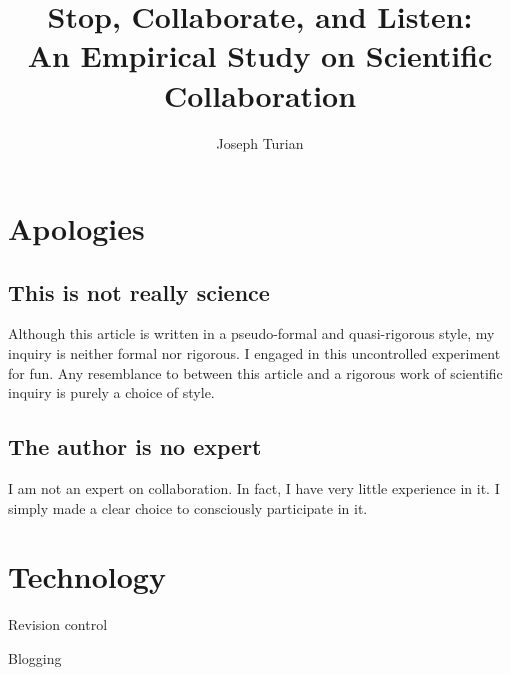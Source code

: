\documentclass[11pt]{article}
\title{Stop, Collaborate, and Listen: \\
An Empirical Study on Scientific Collaboration}
\author{Joseph Turian}
\begin{document}
\maketitle

\section{Apologies}

\subsection{This is not really science}

Although this article is written in a pseudo-formal and quasi-rigorous
style, my inquiry is neither formal nor rigorous. I engaged in this
uncontrolled experiment for fun. Any resemblance to between this article
and a rigorous work of scientific inquiry is purely a choice of style.

\subsection{The author is no expert}

I am not an expert on collaboration. In fact, I have very little
experience in it. I simply made a clear choice to consciously participate
in it.

\section{Technology}

Revision control

Blogging
\end{document}
